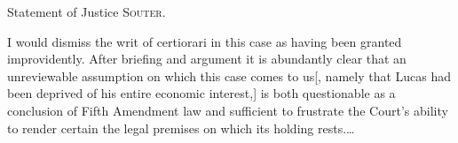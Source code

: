 \opinion Statement of Justice \textsc{Souter}.

I would dismiss the writ of certiorari in this case as having been granted
improvidently. After briefing and argument it is abundantly clear that an
unreviewable assumption on which this case comes to us[, namely that Lucas had
been deprived of his entire economic interest,] is both questionable as a
conclusion of Fifth Amendment law and sufficient to frustrate the Court's
ability to render certain the legal premises on which its holding rests.\ldots


